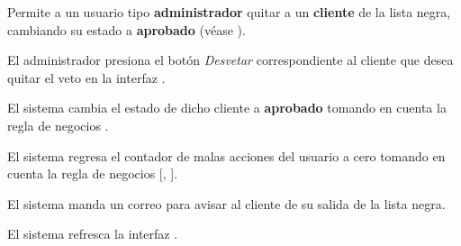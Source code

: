 %
%

{
  Permite a un usuario tipo \textbf{administrador} quitar a un \textbf{cliente}
  de la lista negra, cambiando su estado a \textbf{aprobado} (véase
  ).

  \begin{trayectoriaPrincipal}

    \item El administrador presiona el botón \textit{Desvetar}
      correspondiente al cliente que desea quitar el veto en la interfaz
      .

    \item El sistema cambia el estado de dicho cliente a \textbf{aprobado}
      tomando en cuenta la regla de negocios .

    \item El sistema regresa el contador de malas acciones del usuario a cero
      tomando en cuenta la regla de negocios [,
      ].

    \item El sistema manda un correo para avisar al cliente de su
      salida de la lista negra.

    \item El sistema refresca la interfaz .

  \end{trayectoriaPrincipal}
}
